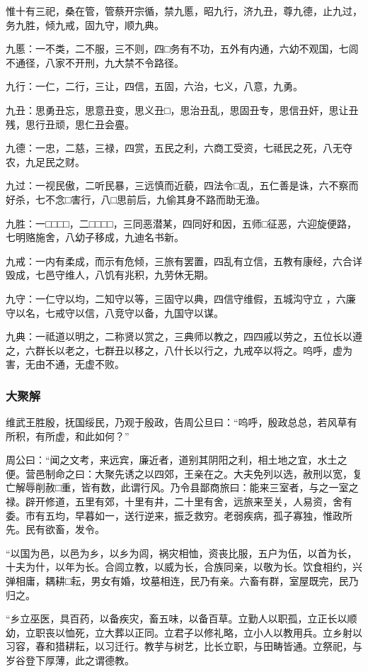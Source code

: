 \documentclass[]{article}
\begin{document}
惟十有三祀，桑在管，管蔡开宗循，禁九慝，昭九行，济九丑，尊九德，止九过，务九胜，倾九戒，固九守，顺九典。

九慝：一不类，二不服，三不则，四□务有不功，五外有内通，六幼不观国，七闾不通径，八家不开刑，九大禁不令路径。

九行：一仁，二行，三让，四信，五固，六治，七义，八意，九勇。

九丑：思勇丑忘，思意丑变，思义丑□，思治丑乱，思固丑专，思信丑奸，思让丑残，思行丑顽，思仁丑会亹。

九德：一忠，二慈，三禄，四赏，五民之利，六商工受资，七祗民之死，八无夺农，九足民之财。

九过：一视民傲，二听民暴，三远慎而近藐，四法令□乱，五仁善是诛，六不察而好杀，七不念□害行，八□思前后，九偷其身不路而助无渔。

九胜：一□□□□，二□□□□，三同恶潜某，四同好和因，五师□征恶，六迎旋便路，七明赂施舍，八幼子移成，九迪名书新。

九戒：一内有柔成，而示有危倾，三旅有罢置，四乱有立信，五教有康经，六合详毁成，七邑守维人，八饥有兆积，九劳休无期。

九守：一仁守以均，二知守以等，三固守以典，四信守维假，五城沟守立
，六廉守以名，七戒守以信，八竞守以备，九国守以谋。

九典：一祗道以明之，二称贤以赏之，三典师以教之，四四戚以劳之，五位长以遵之，六群长以老之，七群丑以移之，八什长以行之，九戒卒以将之。呜呼，虚为害，无由不通，无虚不败。

\hypertarget{header-n211}{%
\subsubsection{大聚解}\label{header-n211}}

维武王胜殷，抚国绥民，乃观于殷政，告周公旦曰：``呜呼，殷政总总，若风草有所积，有所虚，和此如何？''

周公曰：``闻之文考，来远宾，廉近者，道别其阴阳之利，相土地之宜，水土之便。营邑制命之曰：大聚先诱之以四郊，王亲在之。大夫免列以选，赦刑以宽，复亡解辱削赦□重，皆有数，此谓行风。乃令县鄙商旅曰：能来三室者，与之一室之禄。辟开修道，五里有郊，十里有井，二十里有舍，远旅来至关，人易资，舍有委。市有五均，早暮如一，送行逆来，振乏救穷。老弱疾病，孤子寡独，惟政所先。民有欲畜，发令。

``以国为邑，以邑为乡，以乡为闾，祸灾相恤，资丧比服，五户为伍，以首为长，十夫为什，以年为长。合闾立教，以威为长，合族同亲，以敬为长。饮食相约，兴弹相庸，耦耕□耘，男女有婚，坟墓相连，民乃有亲。六畜有群，室屋既完，民乃归之。

``乡立巫医，具百药，以备疾灾，畜五味，以备百草。立勤人以职孤，立正长以顺幼，立职丧以恤死，立大葬以正同。立君子以修礼略，立小人以教用兵。立乡射以习容，春和猎耕耘，以习迁行。教芋与树艺，比长立职，与田畴皆通。立祭祀，与岁谷登下厚薄，此之谓德教。
\end{document}

